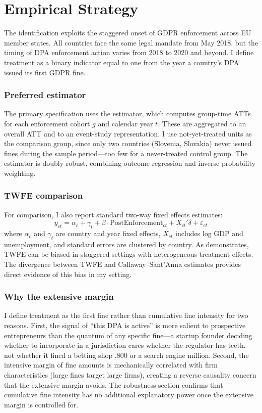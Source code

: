 \documentclass[12pt]{article}
\begin{document}
\section{Empirical Strategy}

The identification exploits the staggered onset of GDPR enforcement across EU member states. All countries face the same legal mandate from May 2018, but the timing of DPA enforcement action varies from 2018 to 2020 and beyond. I define treatment as a binary indicator equal to one from the year a country's DPA issued its first GDPR fine.

\subsubsection*{Preferred estimator} The primary specification uses the \citet{callaway2021} estimator, which computes group-time ATTs for each enforcement cohort $g$ and calendar year $t$. These are aggregated to an overall ATT and to an event-study representation. I use not-yet-treated units as the comparison group, since only two countries (Slovenia, Slovakia) never issued fines during the sample period---too few for a never-treated control group. The estimator is doubly robust, combining outcome regression and inverse probability weighting.

\subsubsection*{TWFE comparison} For comparison, I also report standard two-way fixed effects estimates:
\begin{equation}
y_{ct} = \alpha_c + \gamma_t + \beta \cdot \text{PostEnforcement}_{ct} + X_{ct}'\delta + \varepsilon_{ct}
\label{eq:twfe}
\end{equation}
where $\alpha_c$ and $\gamma_t$ are country and year fixed effects, $X_{ct}$ includes log GDP and unemployment, and standard errors are clustered by country. As \citet{goodmanbacon2021} demonstrates, TWFE can be biased in staggered settings with heterogeneous treatment effects. The divergence between TWFE and Callaway--Sant'Anna estimates provides direct evidence of this bias in my setting.

\subsubsection*{Why the extensive margin} I define treatment as the first fine rather than cumulative fine intensity for two reasons. First, the signal of ``this DPA is active'' is more salient to prospective entrepreneurs than the quantum of any specific fine---a startup founder deciding whether to incorporate in a jurisdiction cares whether the regulator has teeth, not whether it fined a betting shop ,800 or a search engine  million. Second, the intensive margin of fine amounts is mechanically correlated with firm characteristics (large fines target large firms), creating a reverse causality concern that the extensive margin avoids. The robustness section confirms that cumulative fine intensity has no additional explanatory power once the extensive margin is controlled for.
\end{document}

